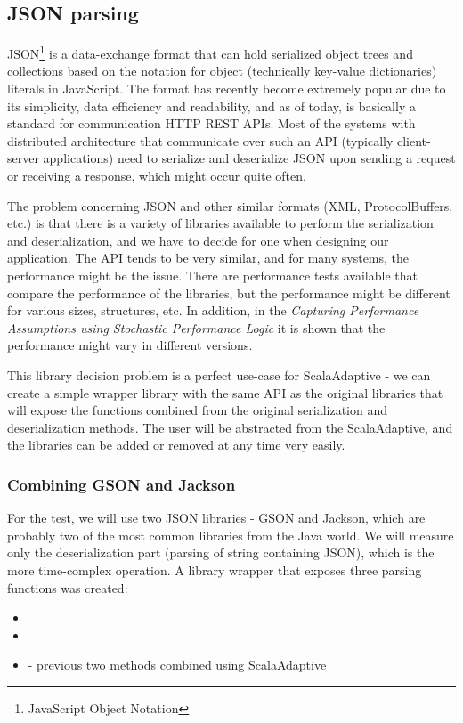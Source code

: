 \subsection{JSON parsing}
\label{subsec:json_parsing}

JSON\footnote{JavaScript Object Notation} is a data-exchange format that can hold serialized object trees and collections based on the notation for object (technically key-value dictionaries) literals in JavaScript. The format has recently become extremely popular due to its simplicity, data efficiency and readability, and as of today, is basically a standard for communication HTTP REST APIs. Most of the systems with distributed architecture that communicate over such an API (typically client-server applications) need to serialize and deserialize JSON upon sending a request or receiving a response, which might occur quite often.


The problem concerning JSON and other similar formats (XML, ProtocolBuffers, etc.) is that there is a variety of libraries available to perform the serialization and deserialization, and we have to decide for one when designing our application. The API tends to be very similar, and for many systems, the performance might be the issue. There are performance tests available that compare the performance of the libraries, but the performance might be different for various sizes, structures, etc. In addition, in the \textit{Capturing Performance Assumptions using Stochastic Performance Logic} it is shown that the performance might vary in different versions.

This library decision problem is a perfect use-case for ScalaAdaptive - we can create a simple wrapper library with the same API as the original libraries that will expose the functions combined from the original serialization and deserialization methods. The user will be abstracted from the ScalaAdaptive, and the libraries can be added or removed at any time very easily.

\subsubsection{Combining GSON and Jackson}

For the test, we will use two JSON libraries - GSON and Jackson, which are probably two of the most common libraries from the Java world. We will measure only the deserialization part (parsing of string containing JSON), which is the more time-complex operation. A library wrapper that exposes three parsing functions was created:
\begin{itemize}
	\item {}
	\item {}
	\item {} - previous two methods combined using ScalaAdaptive
\end{itemize}

